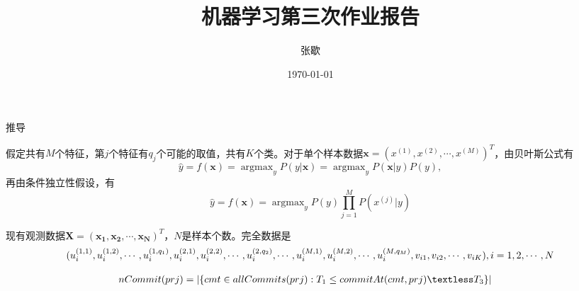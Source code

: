 \documentclass[UTF8]{ctexart}
\title{机器学习第三次作业报告}
\author{张歇}
\date{\today}
\DeclareMathOperator*{\argmax}{argmax}
\begin{document}
\maketitle

推导

假定共有$M$个特征，第$j$个特征有$q_j$个可能的取值，共有$K$个类。对于单个样本数据$\boldsymbol{x}=(x^{(1)}, x^{(2)}, \cdots, x^{(M)})^T$，由贝叶斯公式有$$
\hat{y} = f(\boldsymbol{x}) = \mathop{\argmax}_y {P(y|\boldsymbol{x})} = \mathop{\argmax}_y {P(\boldsymbol{x}|y) P(y)},
$$
再由条件独立性假设，有$$
\hat{y} = f(\boldsymbol{x}) = \mathop{\argmax}_y {P(y) \prod\limits_{j=1}^{M} P(x^{(j)}|y)}
$$

现有观测数据$\boldsymbol{X} = (\boldsymbol{x_1}, \boldsymbol{x_2}, \cdots, \boldsymbol{x_N})^T$，$N$是样本个数。完全数据是$$
(u_{i}^{(1,1)}, u_{i}^{(1,2)}, \cdots, u_{i}^{(1,q_1)}, u_{i}^{(2,1)}, u_{i}^{(2,2)}, \cdots, u_{i}^{(2,q_2)}, \cdots, u_{i}^{(M,1)}, u_{i}^{(M,2)}, \cdots, u_{i}^{(M,q_M)}, \\ v_{i1}, v_{i2}, \cdots, v_{iK}), i = 1, 2, \cdots, N
$$

\begin{align}
\label{def:nCommit}
nCommit(prj) &= \vert \{cmt \in allCommits(prj): T_1 \leq commitAt(cmt, prj) \textless T_3\} \vert
\end{align}

\end{document}
